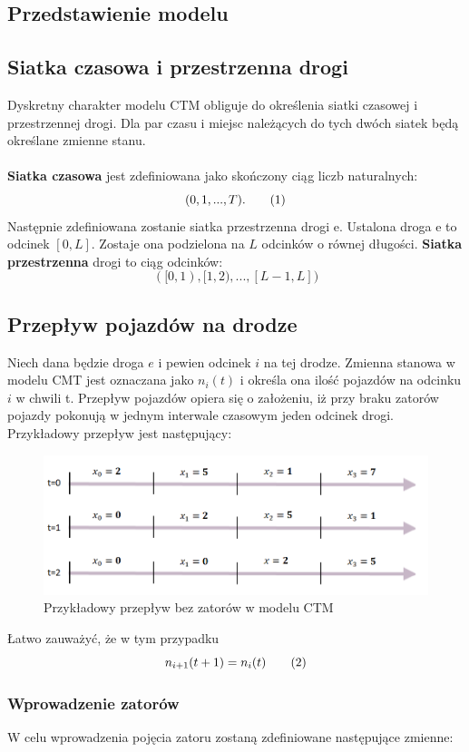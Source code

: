 \documentclass[12pt]{book}
\theoremstyle{plain}
\newcommand\addtag{\refstepcounter{equation}
\renewcommand{\labelenumii}{\theenumii}
\renewcommand{\theenumii}{\theenumi.\arabic{enumii}.}
\tag{\theequation}}
\begin{document}
\subsection{Przedstawienie modelu}
\subsection*{Siatka czasowa i przestrzenna drogi}
Dyskretny charakter modelu CTM obliguje do określenia siatki czasowej i przestrzennej drogi. Dla par czasu i miejsc należących do tych dwóch siatek będą określane zmienne stanu. \\ \\ \textbf{Siatka czasowa} jest zdefiniowana jako skończony ciąg liczb naturalnych:
\[(0,1,...,T). \addtag \]
Następnie zdefiniowana zostanie siatka przestrzenna drogi e. Ustalona droga e to odcinek $[0,L]$. Zostaje ona podzielona na $L$ odcinków o równej długości. \textbf{Siatka przestrzenna} drogi to ciąg odcinków:
\[([0,1),[1,2),...,[L-1,L] )\]

\subsection*{Przepływ pojazdów na drodze}
Niech dana będzie droga $e$ i pewien odcinek $i$ na tej drodze. Zmienna stanowa w modelu CMT jest oznaczana jako $n_i(t)$ i określa ona ilość pojazdów na odcinku $i$ w chwili t.
Przepływ pojazdów opiera się o założeniu, iż przy braku zatorów pojazdy pokonują w jednym interwale czasowym jeden odcinek drogi. Przykładowy przepływ jest następujący:
\begin{figure}[H]
	\centering
	\includegraphics[width=14cm]{images/CTM_flow_example}
	\caption{Przykładowy przepływ bez zatorów w modelu CTM}
	\label{fig:CTM_flow_example}
\end{figure} \noindent
Łatwo zauważyć, że w tym przypadku
\[ n_{i+1}(t+1)=n_i(t) \addtag \]
\subsubsection*{Wprowadzenie zatorów}
W celu wprowadzenia pojęcia zatoru zostaną zdefiniowane następujące zmienne:
\end{document}
